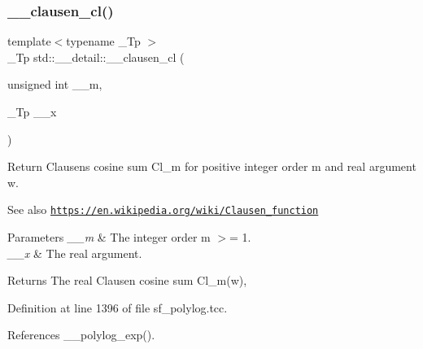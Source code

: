 \mbox{\label{namespacestd_1_1____detail_a523b5171a620d8816339c71994e67bb1}} 
\subsubsection{\texorpdfstring{\+\_\+\+\_\+clausen\+\_\+cl()}{\_\_clausen\_cl()}\hspace{0.1cm}{\footnotesize\ttfamily [2/2]}}
{\footnotesize\ttfamily template$<$typename \+\_\+\+Tp $>$ \\
\+\_\+\+Tp std\+::\+\_\+\+\_\+detail\+::\+\_\+\+\_\+clausen\+\_\+cl (\begin{DoxyParamCaption}\item[{unsigned int}]{\+\_\+\+\_\+m,  }\item[{\+\_\+\+Tp}]{\+\_\+\+\_\+x }\end{DoxyParamCaption})}

Return Clausen\textquotesingle{}s cosine sum Cl\+\_\+m for positive integer order m and real argument w. \begin{DoxySeeAlso}{See also}
\href{https://en.wikipedia.org/wiki/Clausen_function}{\tt https\+://en.\+wikipedia.\+org/wiki/\+Clausen\+\_\+function}
\end{DoxySeeAlso}

\begin{DoxyParams}{Parameters}
{\em \+\_\+\+\_\+m} & The integer order m $>$= 1. \\
\hline
{\em \+\_\+\+\_\+x} & The real argument. \\
\hline
\end{DoxyParams}
\begin{DoxyReturn}{Returns}
The real Clausen cosine sum Cl\+\_\+m(w), 
\end{DoxyReturn}


Definition at line 1396 of file sf\+\_\+polylog.\+tcc.



References \+\_\+\+\_\+polylog\+\_\+exp().

\mbox{\label{namespacestd_1_1____detail_ab7d250f236ef63ed8bd260881b73524d}} 
